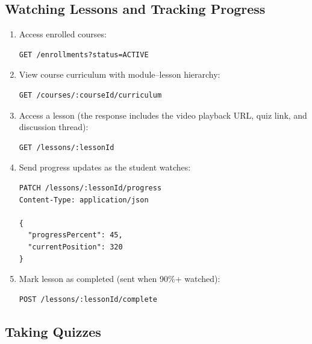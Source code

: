 \subsection{Watching Lessons and Tracking Progress}

\begin{enumerate}
  \item Access enrolled courses:

\begin{lstlisting}[caption=List enrolled courses,label=lst:guide-enrolled-courses]
GET /enrollments?status=ACTIVE
\end{lstlisting}

  \item View course curriculum with module--lesson hierarchy:

\begin{lstlisting}[caption=View course curriculum,label=lst:guide-curriculum]
GET /courses/:courseId/curriculum
\end{lstlisting}

  \item Access a lesson (the response includes the video playback URL, quiz link, and discussion thread):

\begin{lstlisting}[caption=Access lesson,label=lst:guide-access-lesson]
GET /lessons/:lessonId
\end{lstlisting}

  \item Send progress updates as the student watches:

\begin{lstlisting}[caption=Update lesson progress,label=lst:guide-progress]
PATCH /lessons/:lessonId/progress
Content-Type: application/json

{
  "progressPercent": 45,
  "currentPosition": 320
}
\end{lstlisting}

  \item Mark lesson as completed (sent when 90\%+ watched):

\begin{lstlisting}[caption=Complete lesson,label=lst:guide-complete-lesson]
POST /lessons/:lessonId/complete
\end{lstlisting}
\end{enumerate}

\subsection{Taking Quizzes}

